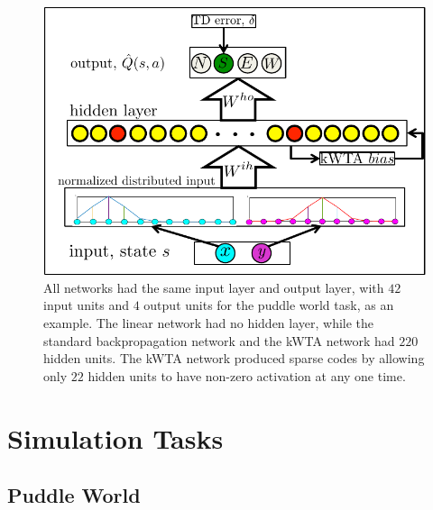 \documentclass[preprint,12pt,authoryear]{elsarticle}
\begin{document}
\begin{figure}
\begin{center}
\includegraphics[scale=0.5]{figures/kWTA-schematic.pdf}
\end{center}
\vspace{-4mm}
\caption{All networks had the same input layer and output layer, with
          $42$ input units and $4$ output units for the puddle world task, as an example. The linear network had
          no hidden layer, while the standard backpropagation network
          and the kWTA network had $220$ hidden units. The kWTA network
          produced sparse codes by allowing only $22$ hidden units to
          have non-zero activation at any one time.}
\label{fig:networks}
\end{figure}




\section{Simulation Tasks} %
\label{sec:simulation_tasks}

\subsection{Puddle World} %
\label{sub:puddle_world}
\end{document}
